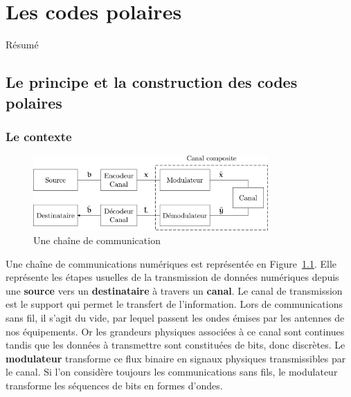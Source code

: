 
\chapter{Les codes polaires}

Résumé

\vspace*{\fill}
\minitocTITI
\vspace*{\fill}


\section{Le principe et la construction des codes polaires}

\subsection{Le contexte}



\begin{figure}[t]
\centering
\includegraphics[width=0.8\textwidth]{main/ch1_fig/chaine_com}
\caption{Une chaîne de communication}
\label{fig:chaine_com}
\end{figure}
Une chaîne de communications numériques est représentée en Figure~\ref{fig:chaine_com}.
Elle représente les étapes usuelles de la transmission de données numériques depuis une \textbf{source} vers un \textbf{destinataire} à travers un \textbf{canal}.
Le canal de transmission est le support qui permet le transfert de l'information. Lors de communications sans fil, il s'agit du vide, par lequel passent les ondes émises par les antennes de nos équipements. Or les grandeurs physiques associées à ce canal sont continues tandis que les données à transmettre sont constituées de bits, donc discrètes. Le \textbf{modulateur} transforme ce flux binaire en signaux physiques transmissibles par le canal. Si l'on considère toujours les communications sans fils, le modulateur transforme les séquences de bits en formes d'ondes.

